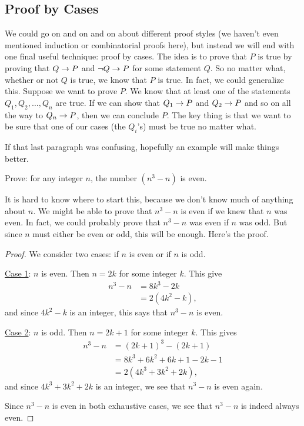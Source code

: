 \documentclass[12pt]{article}
\begin{document}
 
 
\subsection*{Proof by Cases}

We could go on and on and on about different proof styles (we haven't even mentioned induction or combinatorial proofs here), but instead we will end with one final useful technique: proof by cases.  The idea is to prove that $P$ is true by proving that $Q \rightarrow P$ and $\neg Q \rightarrow P$ for some statement $Q$.  So no matter what, whether or not $Q$ is true, we know that $P$ is true.  In fact, we could generalize this.  Suppose we want to prove $P$.  We know that at least one of the statements $Q_1, Q_2, \ldots, Q_n$ are true.  If we can show that $Q_1 \rightarrow P$ and $Q_2 \rightarrow P$ and so on all the way to $Q_n \rightarrow P$, then we can conclude $P$.  The key thing is that we want to be sure that one of our cases (the $Q_i$'s) must be true no matter what.

If that last paragraph was confusing, hopefully an example will make things better.

\begin{example}
Prove: for any integer $n$, the number $(n^3 -n)$ is even.

\begin{solution}
It is hard to know where to start this, because we don't know much of anything about $n$.  We might be able to prove that $n^3 - n$ is even if we knew that $n$ was even.  In fact, we could probably prove that $n^3-n$ was even if $n$ was odd.  But since $n$ must either be even or odd, this will be enough.  Here's the proof.

\begin{proof}
We consider two cases: if $n$ is even or if $n$ is odd.

\underline{Case 1}: $n$ is even.  Then $n = 2k$ for some integer $k$.  This give 
\begin{align*}
n^3 - n & = 8k^3 - 2k \\
& = 2(4k^2 - k),
\end{align*}
 and since $4k^2 - k$ is an integer, this says that $n^3-n$ is even.
 
 \underline{Case 2}: $n$ is odd.  Then $n = 2k+1$ for some integer $k$.  This gives
 \begin{align*}
 n^3 - n & = (2k+1)^3 - (2k+1) \\
 & = 8k^3 + 6k^2 + 6k + 1 - 2k - 1 \\
 & = 2(4k^3 + 3k^2 + 2k),
 \end{align*}
  and since $4k^3 + 3k^2 + 2k$ is an integer, we see that $n^3 - n$ is even again.
  
  Since $n^3 - n$ is even in both exhaustive cases, we see that $n^3 - n$ is indeed always even.
\end{proof}
\end{solution}


\end{example}
\end{document}

